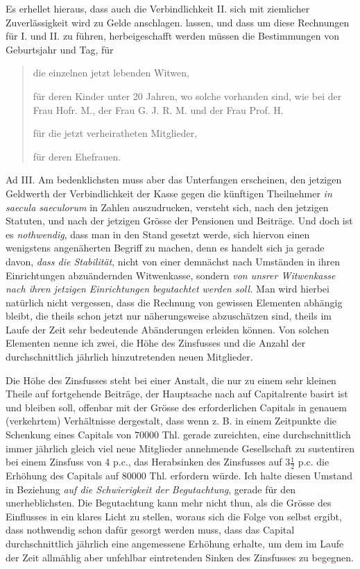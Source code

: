 \par{}
Es erhellet hieraus, dass auch die Verbindlichkeit II. sich mit ziemlicher Zuverlässigkeit wird zu Gelde anschlagen. lassen, und dass um diese Rechnungen für I. und II. zu führen, herbeigeschafft werden müssen die Bestimmungen von Geburtsjahr und Tag, für
\begin{quote}
die einzelnen jetzt lebenden Witwen,\par
für deren Kinder unter 20 Jahren, wo solche vorhanden sind, wie bei der Frau Hofr. M., der Frau G. J. R. M. und der Frau Prof. H.\par
für die jetzt verheiratheten Mitglieder,\par
für deren Ehefrauen.
\end{quote}
\noindent\hspace*{\parindent}Ad III. Am bedenklichsten muss aber das Unterfangen erscheinen, den jetzigen Geldwerth der Verbindlichkeit der Kasse gegen die künftigen Theilnehmer \textit{in saecula saeculorum} in Zahlen auszudrucken, versteht sich, nach den jetzigen Statuten, und nach der jetzigen Grösse der Pensionen und Beiträge. Und doch ist es \textit{nothwendig}, dass man in den Stand gesetzt werde, sich hiervon einen wenigstens angenäherten Begriff zu machen, denn es handelt sich ja gerade davon, \textit{dass die Stabilität}, nicht von einer demnächst nach Umständen in ihren Einrichtungen abzuändernden Witwenkasse, sondern \textit{von unsrer Witwenkasse nach ihren jetzigen Einrichtungen begutachtet werden soll.} Man wird hierbei natürlich nicht vergessen, dass die Rechnung von gewissen Elementen abhängig bleibt, die theils schon jetzt nur näherungsweise abzuschätzen sind, theils im Laufe der Zeit sehr bedeutende Abänderungen erleiden können. Von solchen Elementen nenne ich zwei, die Höhe des Zinsfusses und die Anzahl der durchschnittlich jährlich hinzutretenden neuen Mitglieder.

Die Höhe des Zinsfusses steht bei einer Anstalt, die nur zu einem sehr kleinen Theile auf fortgehende Beiträge, der Hauptsache nach auf Capitalrente basirt ist und bleiben soll, offenbar mit der Grösse des erforderlichen Capitals in genauem (verkehrtem) Verhältnisse dergestalt, dass wenn z. B. in einem Zeitpunkte die Schenkung eines Capitals von 70000 Thl. gerade zureichten, eine durchschnittlich immer jährlich gleich viel neue Mitglieder annehmende Gesellschaft zu sustentiren bei einem Zinsfuss von 4 p.c., das Herabsinken des Zinsfusses auf \(3\frac12\) p.c. die Erhöhung des Capitals auf 80000 Thl. erfordern würde. Ich halte diesen Umstand in Beziehung \textit{auf die Schwierigkeit der Begutachtung}, gerade für den unerheblichsten. Die Begutachtung kann mehr nicht thun, als die Grösse des Einflusses in ein klares Licht zu stellen, woraus sich die Folge von selbst ergibt, dass nothwendig schon dafür gesorgt werden muss, dass das Capital durchschnittlich jährlich eine angemessene Erhöhung erhalte, um dem im Laufe der Zeit allmählig aber unfehlbar eintretenden Sinken des Zinsfusses zu begegnen.

